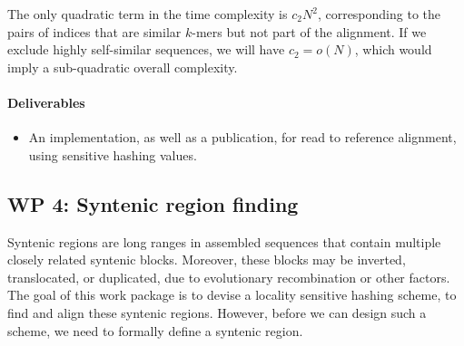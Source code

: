 The only quadratic term in the time complexity is $c_2 N^2$, corresponding to the pairs of indices that are similar $k$-mers but not part of the alignment. If we exclude highly self-similar sequences, we will have $c_2 = o(N)$, which would imply a sub-quadratic overall complexity.   



\paragraph{Deliverables}
\begin{itemize}
\item An implementation, as well as a publication, for read to reference alignment, using sensitive hashing values.
\end{itemize}


\subsection{WP 4: Syntenic region finding}
Syntenic regions are long ranges in assembled sequences that contain multiple closely related syntenic blocks. Moreover, these blocks may be inverted, translocated, or duplicated, due to evolutionary recombination or other factors. The goal of this work package is to devise a locality sensitive hashing scheme, to find and align these syntenic regions. However, before we can design such a scheme, we need to formally define a syntenic region. 


